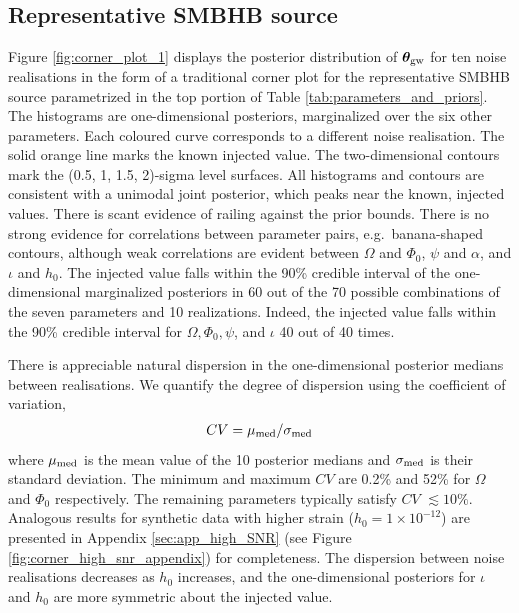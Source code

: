\documentclass[fleqn,usenatbib,useAMS]{mnras}
\begin{document}
\subsection{Representative SMBHB source}\label{sec:rep_smbh_source}

Figure \ref{fig:corner_plot_1} displays the posterior distribution of $\boldsymbol{\theta}_{\rm gw}$ for ten noise realisations in the form of a traditional corner plot for the representative SMBHB source parametrized in the top portion of Table \ref{tab:parameters_and_priors}. The histograms are one-dimensional posteriors, marginalized over the six other parameters. Each coloured curve corresponds to a different noise realisation. The solid orange line marks the known injected value. The two-dimensional contours mark the (0.5, 1, 1.5, 2)-sigma level surfaces. All histograms and contours are consistent with a unimodal joint posterior, which peaks near the known, injected values. There is scant evidence of railing against the prior bounds. There is no strong evidence for correlations between parameter pairs, e.g.\ banana-shaped contours, although weak correlations are evident between $\Omega$ and $\Phi_0$, $\psi$ and $\alpha$, and $\iota$ and $h_0$. The injected value falls within the 90\% credible interval of the one-dimensional marginalized posteriors in 60 out of the 70 possible combinations of the seven parameters and 10 realizations. Indeed, the injected value falls within the 90\% credible interval for $\Omega, \Phi_0, \psi$, and  $\iota$ 40 out of 40 times. \newline  

There is appreciable natural dispersion in the one-dimensional posterior medians between realisations. We quantify the degree of dispersion using the coefficient of variation,
\begin{eqnarray}
	CV = \mu_{\rm med}/\sigma_{\rm med}
\end{eqnarray}
 where $\mu_{\rm med}$ is the mean value of the 10 posterior medians and $\sigma_{\rm med}$ is their standard deviation. The minimum and maximum $CV$ are 0.2\% and 52\% for $\Omega$ and $\Phi_0$ respectively. The remaining parameters typically satisfy $CV$ $\lesssim 10 \%$. Analogous results for synthetic data with higher strain ($h_0 = 1 \times 10^{-12}$) are presented in Appendix \ref{sec:app_high_SNR} (see Figure \ref{fig:corner_high_snr_appendix}) for completeness. The dispersion between noise realisations decreases as $h_0$ increases, and the one-dimensional posteriors for $\iota$ and $h_0$ are more symmetric about the injected value. \newline 
\end{document}
